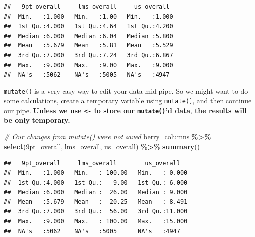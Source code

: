 \documentclass[
]{book}
\newenvironment{Shaded}{\begin{snugshade}}{\end{snugshade}}
\newcommand{\AttributeTok}[1]{\textcolor[rgb]{0.13,0.29,0.53}{#1}}
\newcommand{\CommentTok}[1]{\textcolor[rgb]{0.56,0.35,0.01}{\textit{#1}}}
\newcommand{\FunctionTok}[1]{\textcolor[rgb]{0.13,0.29,0.53}{\textbf{#1}}}
\newcommand{\NormalTok}[1]{#1}
\newcommand{\SpecialCharTok}[1]{\textcolor[rgb]{0.81,0.36,0.00}{\textbf{#1}}}
\newcommand{\StringTok}[1]{\textcolor[rgb]{0.31,0.60,0.02}{#1}}
\begin{document}
\begin{verbatim}
##   9pt_overall     lms_overall     us_overall   
##  Min.   :1.000   Min.   :1.00   Min.   :1.000  
##  1st Qu.:4.000   1st Qu.:4.64   1st Qu.:4.200  
##  Median :6.000   Median :6.04   Median :5.800  
##  Mean   :5.679   Mean   :5.81   Mean   :5.529  
##  3rd Qu.:7.000   3rd Qu.:7.24   3rd Qu.:6.867  
##  Max.   :9.000   Max.   :9.00   Max.   :9.000  
##  NA's   :5062    NA's   :5005   NA's   :4947
\end{verbatim}

\texttt{mutate()} is a very easy way to edit your data mid-pipe. So we might want to do some calculations, create a temporary variable using \texttt{mutate()}, and then continue our pipe. \textbf{Unless we use \texttt{\textless{}-} to store our \texttt{mutate()}'d data, the results will be only temporary.}

\begin{Shaded}
\begin{Highlighting}[]
\CommentTok{\# Our changes from mutate() were not saved}
\NormalTok{berry\_columns }\SpecialCharTok{\%\textgreater{}\%} 
  \FunctionTok{select}\NormalTok{(}\StringTok{\textasciigrave{}}\AttributeTok{9pt\_overall}\StringTok{\textasciigrave{}}\NormalTok{, lms\_overall, us\_overall) }\SpecialCharTok{\%\textgreater{}\%}
  \FunctionTok{summary}\NormalTok{()}
\end{Highlighting}
\end{Shaded}

\begin{verbatim}
##   9pt_overall     lms_overall        us_overall    
##  Min.   :1.000   Min.   :-100.00   Min.   : 0.000  
##  1st Qu.:4.000   1st Qu.:  -9.00   1st Qu.: 6.000  
##  Median :6.000   Median :  26.00   Median : 9.000  
##  Mean   :5.679   Mean   :  20.25   Mean   : 8.491  
##  3rd Qu.:7.000   3rd Qu.:  56.00   3rd Qu.:11.000  
##  Max.   :9.000   Max.   : 100.00   Max.   :15.000  
##  NA's   :5062    NA's   :5005      NA's   :4947
\end{verbatim}
\end{document}
